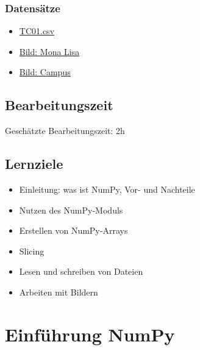\documentclass[
  letterpaper,
  DIV=11,
  numbers=noendperiod]{scrreprt}
\providecommand{\tightlist}{%
  \setlength{\itemsep}{0pt}\setlength{\parskip}{0pt}}\usepackage{longtable,booktabs,array}
\begin{document}
\begin{tcolorbox}
\subsection*{Datensätze}\label{datensuxe4tze}

\begin{itemize}
\tightlist
\item
  \href{https://firedynamics.github.io/LectureComputerScience/_downloads/0d1a3bfbc82fa134e08585d6151e9f46/TC01.csv}{TC01.csv}
\item
  \href{https://upload.wikimedia.org/wikipedia/commons/thumb/6/6a/Mona_Lisa.jpg/677px-Mona_Lisa.jpg}{Bild:
  Mona Lisa}
\item
  \href{https://firedynamics.github.io/LectureComputerScience/_downloads/592f1fc843fc7c01bdcad17bf85ec15c/campus_haspel.jpeg}{Bild:
  Campus}
\end{itemize}

\section*{Bearbeitungszeit}\label{bearbeitungszeit}


Geschätzte Bearbeitungszeit: 2h

\section*{Lernziele}\label{lernziele-1}


\begin{itemize}
\tightlist
\item
  Einleitung: was ist NumPy, Vor- und Nachteile
\item
  Nutzen des NumPy-Moduls
\item
  Erstellen von NumPy-Arrays
\item
  Slicing
\item
  Lesen und schreiben von Dateien
\item
  Arbeiten mit Bildern
\end{itemize}

\chapter{Einführung NumPy}\label{einfuxfchrung-numpy}


\end{tcolorbox}
\end{document}
